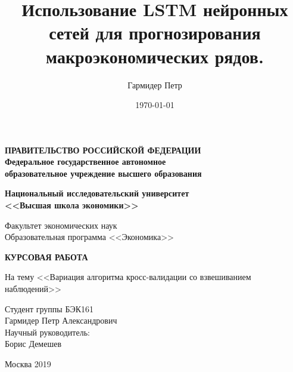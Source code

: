 \documentclass[a4paper, 14pt]{article}
\title{Использование LSTM нейронных сетей для прогнозирования макроэкономических рядов.}
\author{Гармидер Петр}
\date{\today}
\begin{document}
\thispagestyle{empty}
\begin{center}
	\textbf{ПРАВИТЕЛЬСТВО РОССИЙСКОЙ ФЕДЕРАЦИИ}\\
	\vspace{2ex}
	\textbf{Федеральное государственное автономное\\ образовательное учреждение высшего образования}
	
	\vspace{2ex}
	
	\textbf{Национальный исследовательский университет \\ <<Высшая школа экономики>>}
	
	\vspace{8ex}
	\begin{flushright}
		Факультет экономических наук\\
		Образовательная программа <<Экономика>>
	\end{flushright}
\end{center}
\vspace{9ex}

\begin{center}
	{\textbf{КУРСОВАЯ РАБОТА
	}}
	\vspace{1ex}
	
	На тему <<Вариация алгоритма кросс-валидации со взвешиванием наблюдений>>
\end{center}
\vspace{1ex}
\begin{flushright}
	\noindent
	Студент группы БЭК161\\Гармидер Петр Александрович\\
	\vspace{13ex}
	Научный руководитель:\\
	Борис Демешев
	
\end{flushright}	

\vfill

\begin{center}
	Москва 2019
	
\end{center}
\newpage

\tableofcontents

\newpage




\newpage
\end{document}
